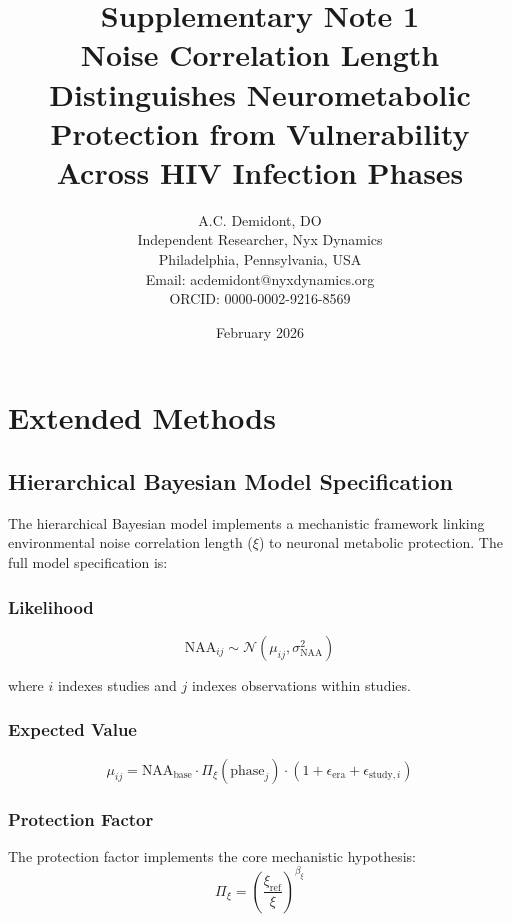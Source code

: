 \documentclass[11pt]{article}
\title{\textbf{Supplementary Note 1}\\[0.5em]
\large Noise Correlation Length Distinguishes Neurometabolic Protection from Vulnerability Across HIV Infection Phases}
\author{A.C. Demidont, DO\\
Independent Researcher, Nyx Dynamics\\
Philadelphia, Pennsylvania, USA\\
Email: acdemidont@nyxdynamics.org\\
ORCID: 0000-0002-9216-8569}
\date{February 2026}
\begin{document}
\maketitle
\tableofcontents
\newpage

\section{Extended Methods}
\label{sec:extended_methods}

\subsection{Hierarchical Bayesian Model Specification}

The hierarchical Bayesian model implements a mechanistic framework linking environmental noise correlation length ($\xi$) to neuronal metabolic protection. The full model specification is:

\subsubsection{Likelihood}
\begin{equation}
\text{NAA}_{ij} \sim \mathcal{N}(\mu_{ij}, \sigma_\text{NAA}^2)
\end{equation}

where $i$ indexes studies and $j$ indexes observations within studies.

\subsubsection{Expected Value}
\begin{equation}
\mu_{ij} = \text{NAA}_\text{base} \cdot \Pi_\xi(\text{phase}_j) \cdot (1 + \epsilon_{\text{era}} + \epsilon_{\text{study},i})
\end{equation}

\subsubsection{Protection Factor}
The protection factor implements the core mechanistic hypothesis:
\begin{equation}
\Pi_\xi = \left(\frac{\xi_\text{ref}}{\xi}\right)^{\beta_\xi}
\end{equation}
\end{document}

